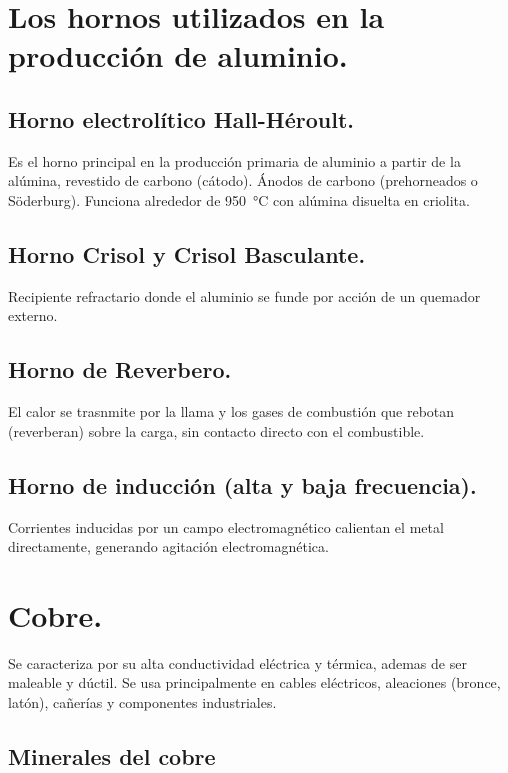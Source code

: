 \documentclass[12pt,a4paper]{article}
\begin{document}
\section{Los hornos utilizados en la producción de aluminio.}

\subsection{Horno electrolítico Hall-Héroult.}

Es el horno principal en la producción primaria de aluminio a partir de la alúmina, revestido de carbono (cátodo). Ánodos de carbono (prehorneados o Söderburg). Funciona alrededor de \SI{950}{\celsius} con alúmina disuelta en criolita.

\subsection{Horno Crisol y Crisol Basculante.}

Recipiente refractario donde el aluminio se funde por acción de un quemador externo.

\subsection{Horno de Reverbero.}

El calor se trasnmite por la llama y los gases de combustión que rebotan (reverberan) sobre la carga, sin contacto directo con el combustible.

\subsection{Horno de inducción (alta y baja frecuencia).}

Corrientes inducidas por un campo electromagnético calientan el metal directamente, generando agitación electromagnética.

\section{Cobre.}

Se caracteriza por su alta conductividad eléctrica y térmica, ademas de ser maleable y dúctil. Se usa principalmente en cables eléctricos, aleaciones (bronce, latón), cañerías y componentes industriales.

\subsection{Minerales del cobre}
\end{document}
